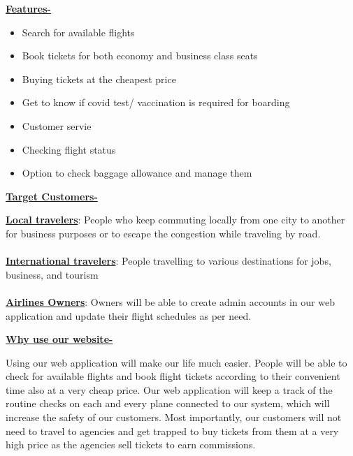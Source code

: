 \documentclass[12pt]{article}
\begin{document}
\LARGE \textbf{\underline{Features-}}  
\normalsize
\begin{itemize}
\itemsep0em
\item Search for available flights
\item Book tickets for both economy and business class seats
\item Buying tickets at the cheapest price
\item Get to know if covid test/ vaccination is required for boarding
\item Customer servie
\item Checking flight status
\item Option to check baggage allowance and manage them  \\ 
\end{itemize} 
\LARGE \textbf{\underline{Target Customers-}}   \\ 
\normalsize
\begin{singlespace}
\textbf{\underline{Local travelers}}: People who keep commuting locally from one city to another
for business purposes or to escape the congestion while traveling by road.\\~\\
\textbf{\underline{International travelers}}: People travelling to various destinations for jobs,
business, and tourism\\~\\
\textbf{\underline{Airlines Owners}}: Owners will be able to create admin accounts in our web
application and update their flight schedules as per need.\\
\end{singlespace}
\vspace{5mm}
\LARGE \textbf{\underline{Why use our website-}}   \\ \vspace{2mm}
\normalsize
\begin{singlespace}
Using our web application will make our life much easier. People will be able to
check for available flights and book flight tickets according to their convenient
time also at a very cheap price. Our web application will keep a track of the
routine checks on each and every plane connected to our system, which will
increase the safety of our customers. Most importantly, our customers will not
need to travel to agencies and get trapped to buy tickets from them at a very high 
price as the agencies sell tickets to earn commissions.\\
\end{singlespace}
\end{document}
